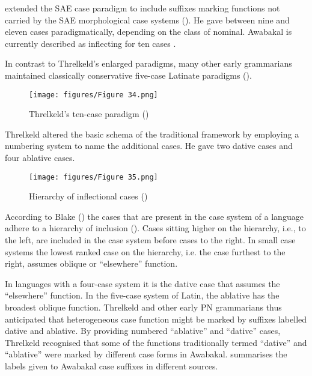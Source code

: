 \citet{threlkeld_australian_1834} extended the SAE case paradigm to include suffixes marking functions not carried by the SAE morphological case systems (). He gave between nine and eleven cases paradigmatically, depending on the class of nominal. Awabakal is currently described as inflecting for ten cases \citep[26]{lissarrague_salvage_2006}.

In contrast to Threlkeld’s enlarged paradigms, many other early grammarians maintained classically conservative five-case Latinate paradigms ().

\begin{figure}
\texttt{[image: figures/Figure 34.png]}
\caption{\label{fig:3:34} Threlkeld’s ten-case paradigm (\citeyear[14]{threlkeld_australian_1834})}
\end{figure}

Threlkeld altered the basic schema of the traditional framework by employing a numbering system to name the additional cases. He gave two dative cases and four ablative cases. 

\begin{figure}
\texttt{[image: figures/Figure 35.png]}
\caption{Hierarchy of inflectional cases (\citealt[159]{blake_1994})}
\label{fig:3:35}
\end{figure}

According to Blake (\citeyear[157--162]{blake_1994}) the cases that are present in the case system of a language adhere to a hierarchy of inclusion (). Cases sitting higher on the hierarchy, i.e., to the left, are included in the case system before cases to the right. In small case systems the lowest ranked case on the hierarchy, i.e. the case furthest to the right, assumes oblique or “elsewhere” function.



In languages with a four-case system it is the dative case that assumes the “elsewhere” function. In the five-case system of Latin, the ablative has the broadest oblique function. Threlkeld and other early PN grammarians thus anticipated that heterogeneous case function might be marked by suffixes labelled dative and ablative. By providing numbered “ablative” and “dative” cases, Threlkeld recognised that some of the functions traditionally termed “dative” and “ablative” were marked by different case forms in Awabakal.  summarises the labels given to Awabakal case suffixes in different sources.

